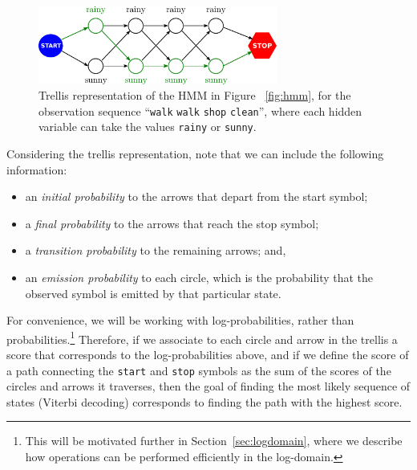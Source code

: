 \begin{figure}[ht]
\centering
\includegraphics[width=0.7\textwidth]{figs/sequences/trellis_new}
\caption[HMM Trellis representation.]{\label{fig:trellis} Trellis
  representation of the HMM in Figure ~\ref{fig:hmm}, for the observation
  sequence ``{\tt walk} {\tt walk} {\tt shop} {\tt clean}'', where each hidden variable can take the values {\tt rainy} or {\tt sunny}.}
\end{figure}




Considering the trellis representation, note that we can include the following information:
\begin{itemize}
\item an \emph{initial probability} to the arrows that depart from the start symbol;
\item a \emph{final probability} to the arrows that reach the stop symbol;
\item a \emph{transition probability} to the remaining arrows; and,
\item an \emph{emission probability} to each circle, which is the probability that the observed symbol is emitted by that particular state.
\end{itemize}

For convenience, we will be working with 
log-probabilities, rather than probabilities.\footnote{This will be motivated further in Section~\ref{sec:logdomain}, where we describe 
how operations can be performed efficiently
in the log-domain.} Therefore, if we associate to each circle and arrow in
the trellis a score that corresponds
to the log-probabilities above, 
and if we define the score of a path
connecting the {\tt start} and  {\tt stop} symbols as
the sum of the scores of the circles and arrows
it traverses, 
then 
the goal of finding the most likely sequence of states (Viterbi decoding) corresponds to 
finding the path with the highest score.






